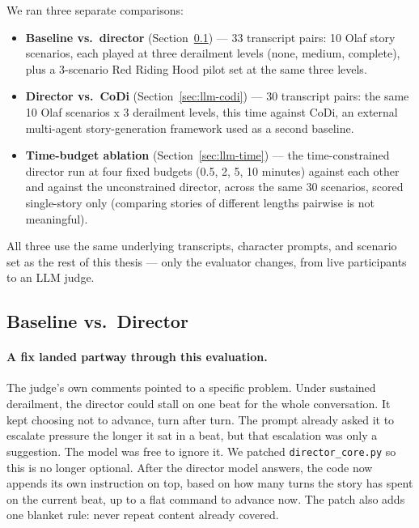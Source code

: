\documentclass[10pt]{article}
\begin{document}
We ran three separate comparisons:

\begin{itemize}
\item \textbf{Baseline vs.\ director} (Section~\ref{sec:llm-baseline}) — 33 transcript pairs: 10 Olaf story scenarios, each played at three derailment levels (none, medium, complete), plus a 3-scenario Red Riding Hood pilot set at the same three levels.
\item \textbf{Director vs.\ CoDi} (Section~\ref{sec:llm-codi}) — 30 transcript pairs: the same 10 Olaf scenarios x 3 derailment levels, this time against CoDi, an external multi-agent story-generation framework used as a second baseline.
\item \textbf{Time-budget ablation} (Section~\ref{sec:llm-time}) — the time-constrained director run at four fixed budgets (0.5, 2, 5, 10 minutes) against each other and against the unconstrained director, across the same 30 scenarios, scored single-story only (comparing stories of different lengths pairwise is not meaningful).
\end{itemize}

All three use the same underlying transcripts, character prompts, and scenario set as the rest of this thesis — only the evaluator changes, from live participants to an LLM judge.

\subsection{Baseline vs.\ Director}
\label{sec:llm-baseline}

\paragraph{A fix landed partway through this evaluation.}
The judge's own comments pointed to a specific problem. Under sustained derailment, the director could stall on one beat for the whole conversation. It kept choosing not to advance, turn after turn. The prompt already asked it to escalate pressure the longer it sat in a beat, but that escalation was only a suggestion. The model was free to ignore it. We patched \texttt{director\_core.py} so this is no longer optional. After the director model answers, the code now appends its own instruction on top, based on how many turns the story has spent on the current beat, up to a flat command to advance now. The patch also adds one blanket rule: never repeat content already covered.
\end{document}
